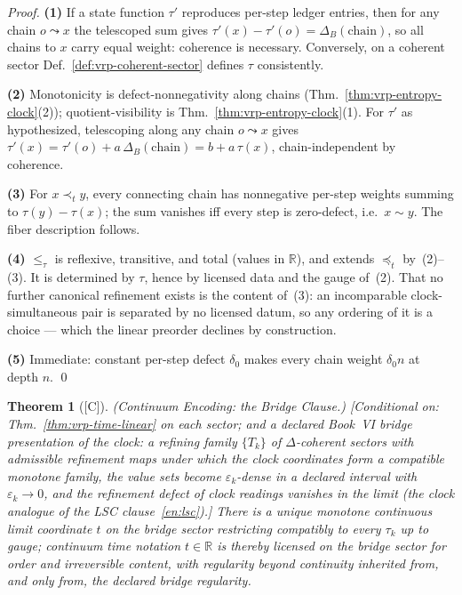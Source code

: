\documentclass[12pt,oneside]{amsbook}
\theoremstyle{plain}
\newtheorem{theorem}{Theorem}[section]
\theoremstyle{definition}
\theoremstyle{remark}
\newcommand{\status}[1]{\textup{[#1]}}
\begin{document}
\begin{proof}
\textbf{(1)}  If a state function $\tau'$ reproduces per-step
ledger entries, then for any chain $o \leadsto x$ the telescoped
sum gives $\tau'(x) - \tau'(o) = \Delta_B(\text{chain})$, so all
chains to $x$ carry equal weight: coherence is necessary.
Conversely, on a coherent sector
Def.~\ref{def:vrp-coherent-sector} defines $\tau$ consistently.

\textbf{(2)}  Monotonicity is defect-nonnegativity along chains
(Thm.~\ref{thm:vrp-entropy-clock}(2)); quotient-visibility is
Thm.~\ref{thm:vrp-entropy-clock}(1).  For $\tau'$ as hypothesized,
telescoping along any chain $o \leadsto x$ gives
$\tau'(x) = \tau'(o) + a\,\Delta_B(\text{chain}) = b + a\,\tau(x)$,
chain-independent by coherence.

\textbf{(3)}  For $x \prec_t y$, every connecting chain has
nonnegative per-step weights summing to $\tau(y) - \tau(x)$; the
sum vanishes iff every step is zero-defect, i.e.\ $x \sim y$.
The fiber description follows.

\textbf{(4)}  $\le_\tau$ is reflexive, transitive, and total
(values in $\mathbb{R}$), and extends $\preceq_t$ by~(2)--(3).
It is determined by $\tau$, hence by licensed data and the gauge
of~(2).  That no further canonical refinement exists is the
content of~(3): an incomparable clock-simultaneous pair is
separated by no licensed datum, so any ordering of it is a choice
--- which the linear preorder declines by construction.

\textbf{(5)}  Immediate: constant per-step defect $\delta_0$
makes every chain weight $\delta_0 n$ at depth $n$. \qed
\end{proof}

\begin{theorem}[\status{C}]\label{thm:vrp-time-smooth}
\textup{(Continuum Encoding: the Bridge Clause.)}
\textup{[Conditional on: Thm.~\ref{thm:vrp-time-linear} on each
sector; and a declared Book~VI bridge presentation of the clock:
a refining family $\{T_k\}$ of $\Delta$-coherent sectors with
admissible refinement maps under which the clock coordinates form
a compatible monotone family, the value sets become
$\varepsilon_k$-dense in a declared interval with
$\varepsilon_k \to 0$, and the refinement defect of clock
readings vanishes in the limit (the clock analogue of the LSC
clause~\ref{en:lsc}).]}
There is a unique monotone continuous limit coordinate
$t$ on the bridge sector restricting compatibly to every
$\tau_k$ up to gauge; continuum time notation $t \in \mathbb{R}$
is thereby licensed on the bridge sector \emph{for order and
irreversible content}, with regularity beyond continuity
inherited from, and only from, the declared bridge regularity.
\end{theorem}
\end{document}
